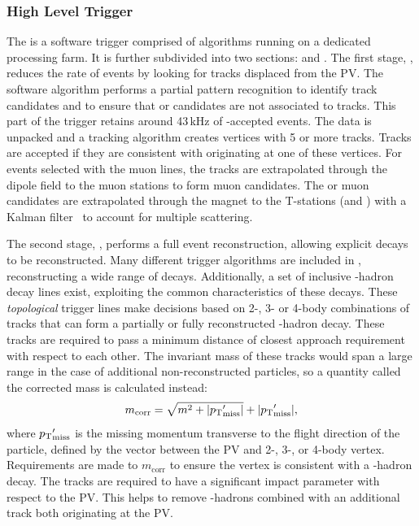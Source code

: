\subsubsection{High Level Trigger}

The \hlt is a software trigger comprised of \cpp algorithms running on a dedicated processing farm. It is further subdivided into two sections: \hltone and \hlttwo. 
The first stage, \hltone, reduces the rate of events by looking for tracks displaced from the PV.
The software algorithm performs a partial pattern recognition to identify track candidates and to ensure that \Pgamma or \piz \lone candidates are not associated to tracks. This part of the trigger retains around 43\,kHz of \lone-accepted events.
The \velo data is unpacked and a tracking algorithm creates vertices with 5 or more tracks.
Tracks are accepted if they are consistent with originating at one of these vertices. For events selected with the muon \lone lines, the \velo tracks are extrapolated through the dipole field to the muon stations to form muon candidates. 
The \velo or muon candidates are extrapolated through the magnet to the T-stations (\ot and \intr) with a Kalman filter~\cite{Kalmanone,FRUHWIRTH1987444} to account for multiple scattering.




The second stage, \hlttwo, performs a full event reconstruction, allowing explicit decays to be reconstructed. Many different trigger algorithms are included in \hlttwo, reconstructing a wide range of decays. Additionally, a set of inclusive \bquark-hadron decay lines exist, exploiting the common characteristics of these decays. These \emph{topological} trigger lines make decisions based on 2-, 3- or 4-body combinations of tracks that can form a partially or fully reconstructed \bquark-hadron decay. These tracks are required to pass a minimum distance of closest approach requirement with respect to each other. The invariant mass of these tracks would span a large range in the case of additional non-reconstructed particles, so a quantity called the corrected mass is calculated instead:
\begin{equation}
m_{\text{corr}} = \sqrt{m^{2} + |\mbox{$p_{\mathrm{ T}}$}'_{\text{miss}}|} + |\mbox{$p_{\mathrm{ T}}$}'_{\text{miss}}|,
\end{equation}   
where $\mbox{$p_{\mathrm{ T}}$}'_{\text{miss}}$ is the missing momentum transverse to the flight direction of the particle, defined by the vector between the PV and 2-, 3-, or 4-body vertex. Requirements are made to $m_{\text{corr}}$ to ensure the vertex is consistent with a \bquark-hadron decay.
The tracks are required to have a significant impact parameter with respect to the PV. This helps to remove \cquark-hadrons combined with an additional track both originating at the PV.



